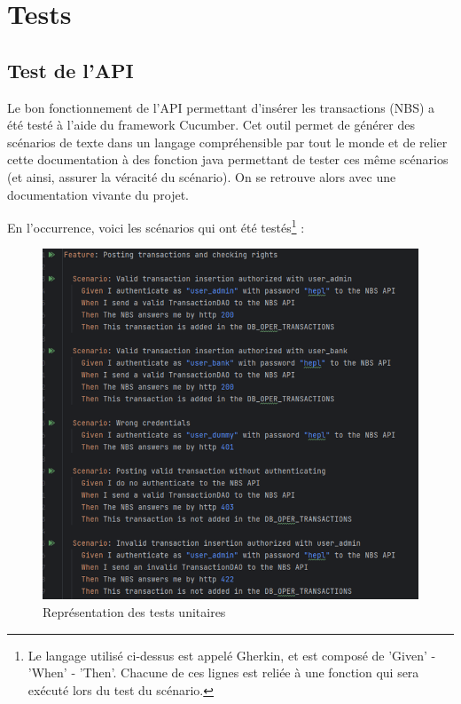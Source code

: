 \section{Tests}

\subsection{Test de l'API}

Le bon fonctionnement de l'API permettant d'insérer les transactions (NBS) a été testé à l'aide du
framework Cucumber. Cet outil permet de générer des scénarios de texte dans un langage
compréhensible par tout le monde et de relier cette documentation à des fonction java permettant de
tester ces même scénarios (et ainsi, assurer la véracité du scénario). On se retrouve alors avec une
documentation vivante du projet.

En l'occurrence, voici les scénarios qui ont été testés\footnote{Le langage utilisé ci-dessus est appelé Gherkin, et est composé de 'Given' - 'When' - 'Then'. Chacune
de ces lignes est reliée à une fonction qui sera exécuté lors du test du scénario.} :

\begin{figure}[H]
    \centering
    \includegraphics[width=\textwidth]{./img/thibault-Tests_1.png}
    \caption{Représentation des tests unitaires}
    \label{fig:thibault-unit-testing-01}
\end{figure}

